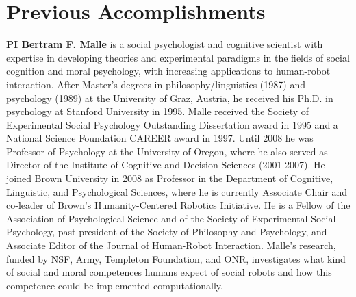 \documentclass[12pt]{article}
\begin{document}




\section*{Previous Accomplishments}

\textbf{PI  Bertram F. Malle} is a social psychologist and cognitive scientist with expertise in developing theories and experimental paradigms in the fields of social cognition and moral psychology, with increasing applications to human-robot interaction.  After Master’s degrees in philosophy/linguistics (1987) and psychology (1989) at the University of Graz, Austria, he received his Ph.D. in psychology at Stanford University in 1995.  Malle received the Society of Experimental Social Psychology Outstanding Dissertation award in 1995 and a National Science Foundation CAREER award in 1997.  Until 2008 he was Professor of Psychology at the University of Oregon, where he also served as Director of the Institute of Cognitive and Decision Sciences (2001-2007).  He joined Brown University in 2008 as Professor in the Department of Cognitive, Linguistic, and Psychological Sciences, where he is currently Associate Chair and co-leader of Brown's Humanity-Centered Robotics Initiative.  He is a Fellow of the Association of Psychological Science and of the Society of Experimental Social Psychology, past president of the Society of Philosophy and Psychology, and Associate Editor of the Journal of Human-Robot Interaction. Malle’s research, funded by NSF, Army, Templeton Foundation, and ONR, investigates what kind of social and moral competences humans expect of social robots and how this competence could be implemented computationally.   
\end{document}
